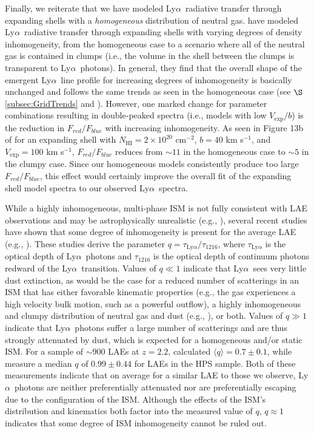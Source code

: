 \documentclass{emulateapj}
\newcommand{\lya}{Ly$\alpha$}
\begin{document}
Finally, we reiterate that we have modeled \lya\ radiative transfer through expanding shells with a \textit{homogeneous} distribution of neutral gas. \citet{duval2013} have modeled \lya\ radiative transfer through expanding shells with varying degrees of density inhomogeneity, from the homogeneous case to a scenario where all of the neutral gas is contained in clumps (i.e., the volume in the shell between the clumps is transparent to \lya\ photons). In general, they find that the overall shape of the emergent \lya\ line profile for increasing degrees of inhomogeneity is basically unchanged and follows the same trends as seen in the homogeneous case (see $\S$\ref{subsec:GridTrends} and \citealp{verhamme2006}). However, one marked change for parameter combinations resulting in double-peaked spectra (i.e., models with low $V_{\mathrm{exp}} / b$) is the reduction in $F_{red} / F_{blue}$ with increasing inhomogeneity. As seen in Figure 13b of \citet{duval2013} for an expanding shell with $N_{\mathrm{HI}} = 2\times10^{20}$ cm$^{-2}$, $b = 40$ km s$^{-1}$, and $V_{\mathrm{exp}} = 100$ km s$^{-1}$, $F_{red} / F_{blue}$ reduces from $\sim11$ in the homogeneous case to $\sim5$ in the clumpy case. Since our homogeneous models consistently produce too large $F_{red} / F_{blue}$, this effect would certainly improve the overall fit of the expanding shell model spectra to our observed \lya\ spectra. 

While a highly inhomogeneous, multi-phase ISM is not fully consistent with LAE observations and may be astrophysically unrealistic (e.g., \citealp{scarlata2009,duval2013,laursen2013}), several recent studies have shown that some degree of inhomogeneity is present for the average LAE (e.g., \citealp{blanc2011,nakajima2012}). These studies derive the parameter $q = \tau_{\mathrm{Ly}\alpha} / \tau_{1216}$, where $\tau_{\mathrm{Ly}\alpha}$ is the optical depth of \lya\ photons and $\tau_{1216}$ is the optical depth of continuum photons redward of the \lya\ transition. Values of $q \ll 1$ indicate that \lya\ sees very little dust extinction, as would be the case for a reduced number of scatterings in an ISM that has either favorable kinematic properties (e.g., the gas experiences a high velocity bulk motion, such as a powerful outflow), a highly inhomogeneous and clumpy distribution of neutral gas and dust (e.g., \citealp{neufeld1991,hansen2006}), or both. Values of $q \gg 1$ indicate that \lya\ photons suffer a large number of scatterings and are thus strongly attenuated by dust, which is expected for a homogeneous and/or static ISM. For a sample of $\sim900$ LAEs at $z=2.2$, \citet{nakajima2012} calculated $\langle q \rangle = 0.7 \pm 0.1$, while \citet{blanc2011} measure a median $q$ of $0.99\pm0.44$ for LAEs in the HPS sample. Both of these measurements indicate that on average for a similar LAE to those we observe, \lya\ photons are neither preferentially attenuated nor are preferentially escaping due to the configuration of the ISM. Although the effects of the ISM's distribution and kinematics both factor into the measured value of $q$, $q\approx1$ indicates that some degree of ISM inhomogeneity cannot be ruled out.
\end{document}
